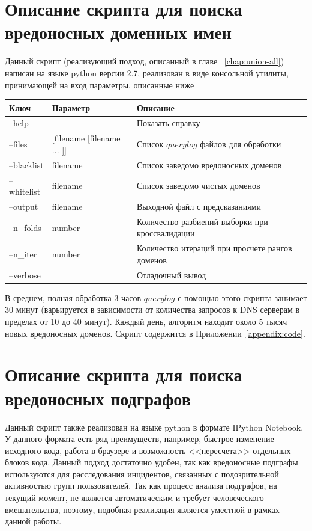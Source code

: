 \documentclass[14pt]{extreport} %
\begin{document}
\section{Описание скрипта для поиска вредоносных доменных имен}
Данный скрипт (реализующий подход, описанный в главе ~\ref{chap:union-all}) написан на языке python версии 2.7, реализован в виде консольной утилиты, принимающей на вход параметры, описанные ниже
\begin{center}
	\begin{tabular}{|p{3cm}|p{5cm}|p{7cm}|}
		\hline
		Ключ    & Параметр           & Описание                                                                           \\ \hline
		--help      &                            & Показать справку                                                            \\ \hline
		--files     & [filename [filename ... ]] & Список $querylog$ файлов для обработки                             \\ \hline
		--blacklist & filename                   & Список заведомо вредоносных доменов                        \\ \hline
		--whitelist & filename                   & Список заведомо чистых доменов                                  \\ \hline
		--output    & filename                   & Выходной файл с предсказаниями                                  \\ \hline
		--n\_folds  & number                     & Количество разбиений выборки при кроссвалидации \\ \hline
		--n\_iter   & number                     & Количество итераций при просчете рангов доменов  \\ \hline
		--verbose   &                            & Отладочный вывод                                                            \\ \hline
	\end{tabular}
\end{center}

В среднем, полная обработка 3 часов $querylog$ с помощью этого скрипта занимает 30 минут (варьируется в зависимости от количества запросов к DNS серверам в пределах от 10 до 40 минут). Каждый день, алгоритм находит около 5 тысяч новых вредоносных доменов. Скрипт содержится в Приложении~\ref{appendix:code}.


\section{Описание скрипта для поиска вредоносных подграфов}
Данный скрипт также реализован на языке python в формате IPython Notebook. У данного формата есть ряд преимуществ, например, быстрое изменение исходного кода, работа в браузере и возможность <<пересчета>> отдельных блоков кода. Данный подход достаточно удобен, так как вредоносные подграфы используются для расследования инцидентов, связанных с подозрительной активностью групп пользователей. Так как процесс анализа подграфов, на текущий момент, не является автоматическим и требует человеческого вмешательства, поэтому, подобная реализация является уместной в рамках данной работы.
\end{document}
